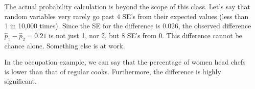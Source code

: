 \documentclass[11pt, chapterprefix=true]{scrbook}\usepackage[]{graphicx}\usepackage[]{color}
\begin{document}
The actual probability calculation is beyond the scope of this class.  Let's say that random variables very rarely go past 4 SE's from their expected values (less than 1 in 10,000 times).  Since the SE for the difference is 0.026, the observed difference $\hat{p}_1 - \hat{p}_2 = 0.21$  is not just 1, nor 2, but 8 SE's from 0.  This difference cannot be chance alone.   Something else is at work.

\begin{center}
\end{center}

In the occupation example, we can say that the percentage of women head chefs
is lower than that of regular cooks.  Furthermore, the difference is highly significant.
\end{document}
